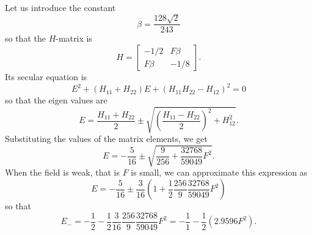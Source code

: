 Let us introduce the constant
\begin{equation}\label{c1e29}
\beta = \frac{128\sqrt{2}}{243}
\end{equation}
so that the $H$-matrix is
\begin{equation}\label{c1e30}
H = \begin{bmatrix} -1/2 & F\beta \\ F\beta & -1/8 \end{bmatrix}.
\end{equation}
Its secular equation is
\begin{equation}\label{c1e31}
E^2 +  (H_{11} + H_{22})E + (H_{11}H_{22} - H_{12})^2 = 0
\end{equation}
so that the eigen values are
\begin{equation}\label{c1e32}
E = \frac{H_{11} + H_{22}}{2} \pm \sqrt{\left(\frac{H_{11} - H_{22}}{2}\right)^2
+ H_{12}^2}.
\end{equation}
Substituting the values of the matrix elements, we get
\begin{equation}\label{c1e33}
E = -\frac{5}{16} \pm \sqrt{\frac{9}{256} + \frac{32768}{59049}F^2}.
\end{equation}
When the field is weak, that is $F$ is small, we can approximate this expression
as
\[
E = -\frac{5}{16} \pm \frac{3}{16}\left(1 + \frac{1}{2}\frac{256}{9}
\frac{32768}{59049}F^2\right)
\]
so that
\[
E_- = -\frac{1}{2} - \frac{1}{2}\frac{3}{16}\frac{256}{9}\frac{32768}{59049}F^2
= -\frac{1}{1} - \frac{1}{2}(2.9596 F^2).
\]

